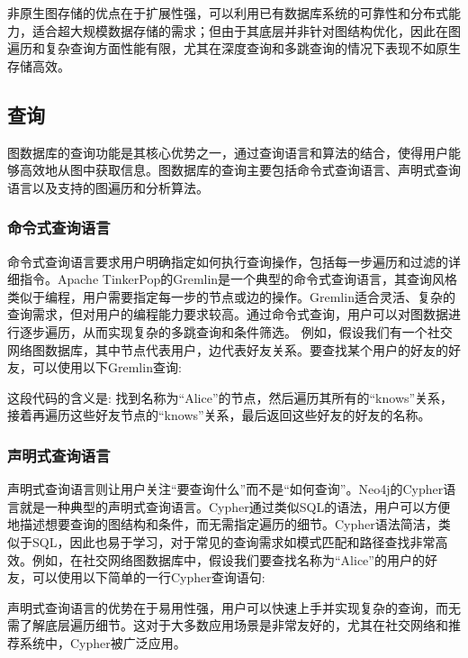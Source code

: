 非原生图存储的优点在于扩展性强，可以利用已有数据库系统的可靠性和分布式能力，适合超大规模数据存储的需求；但由于其底层并非针对图结构优化，因此在图遍历和复杂查询方面性能有限，尤其在深度查询和多跳查询的情况下表现不如原生存储高效。

\subsection{查询}

图数据库的查询功能是其核心优势之一，通过查询语言和算法的结合，使得用户能够高效地从图中获取信息。图数据库的查询主要包括命令式查询语言、声明式查询语言以及支持的图遍历和分析算法。
\subsubsection*{命令式查询语言}

命令式查询语言要求用户明确指定如何执行查询操作，包括每一步遍历和过滤的详细指令。Apache TinkerPop的Gremlin是一个典型的命令式查询语言，其查询风格类似于编程，用户需要指定每一步的节点或边的操作。Gremlin适合灵活、复杂的查询需求，但对用户的编程能力要求较高。通过命令式查询，用户可以对图数据进行逐步遍历，从而实现复杂的多跳查询和条件筛选。
例如，假设我们有一个社交网络图数据库，其中节点代表用户，边代表好友关系。要查找某个用户的好友的好友，可以使用以下Gremlin查询:


这段代码的含义是: 找到名称为“Alice”的节点，然后遍历其所有的“knows”关系，接着再遍历这些好友节点的“knows”关系，最后返回这些好友的好友的名称。

\subsubsection*{声明式查询语言}

声明式查询语言则让用户关注“要查询什么”而不是“如何查询”。Neo4j的Cypher语言就是一种典型的声明式查询语言。Cypher通过类似SQL的语法，用户可以方便地描述想要查询的图结构和条件，而无需指定遍历的细节。Cypher语法简洁，类似于SQL，因此也易于学习，对于常见的查询需求如模式匹配和路径查找非常高效。例如，在社交网络图数据库中，假设我们要查找名称为“Alice”的用户的好友，可以使用以下简单的一行Cypher查询语句:


声明式查询语言的优势在于易用性强，用户可以快速上手并实现复杂的查询，而无需了解底层遍历细节。这对于大多数应用场景是非常友好的，尤其在社交网络和推荐系统中，Cypher被广泛应用。

